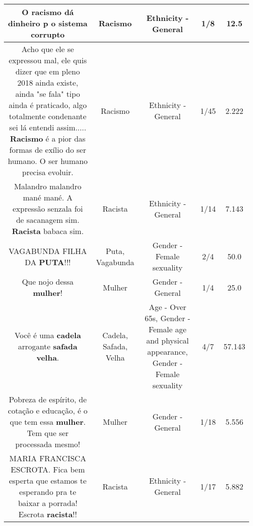 \documentclass[11pt]{article}
\newlength\mylength
\begin{document}
\begin{center}
\begin{longtable}{|C{.65\mylength}|C{.30\mylength}|C{.12\mylength}|C{.12\mylength}|C{.12\mylength}|}
  \small O \textbf{racismo} dá dinheiro p o sistema corrupto\normalsize   & Racismo & Ethnicity - General & 1/8 & 12.5 \\  \hline
  \small Acho que ele se expressou mal, ele quis dizer que em pleno 2018 ainda existe, ainda "se fala" tipo ainda é praticado, algo totalmente condenante sei lá entendi assim..... \textbf{Racismo} é a pior das formas de exílio do ser humano. O ser humano precisa evoluir.\normalsize   & Racismo & Ethnicity - General & 1/45 & 2.222 \\  \hline
  \small Malandro malandro mané mané. A expressão senzala foi de sacanagem sim. \textbf{Racista} babaca sim.\normalsize   & Racista & Ethnicity - General & 1/14 & 7.143 \\  \hline
  \small VAGABUNDA FILHA DA \textbf{PUTA}!!!\normalsize   & Puta, Vagabunda & Gender - Female sexuality & 2/4 & 50.0 \\  \hline
  \small Que nojo dessa \textbf{mulher}!\normalsize   & Mulher & Gender - General & 1/4 & 25.0 \\  \hline
  \small Você é uma \textbf{cadela} arrogante \textbf{safada} \textbf{v\textbf{elha}}.\normalsize   & Cadela, Safada, Velha & Age - Over 65s, Gender - Female age and physical appearance, Gender - Female sexuality & 4/7 & 57.143 \\  \hline
  \small Pobreza de espírito, de cotação e educação, é o que tem essa \textbf{mulher}. Tem que ser processada mesmo!\normalsize   & Mulher & Gender - General & 1/18 & 5.556 \\  \hline
  \small MARIA FRANCISCA ESCROTA. Fica bem esperta que estamos te esperando pra te baixar a porrada! Escrota \textbf{racista}!!\normalsize   & Racista & Ethnicity - General & 1/17 & 5.882 \\  \hline

\end{longtable}
\end{center}
\end{document}
